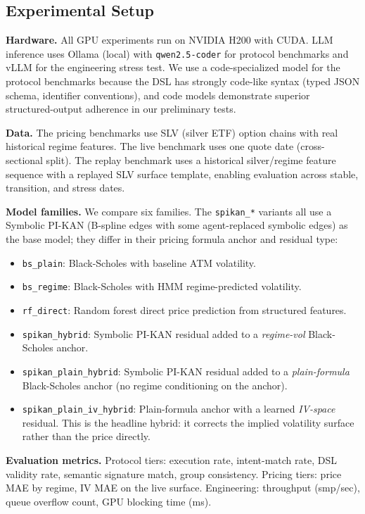 \documentclass[11pt,a4paper]{article}
\begin{document}
\subsection{Experimental Setup}

\textbf{Hardware.} All GPU experiments run on NVIDIA H200 with CUDA. LLM inference uses
Ollama (local) with \texttt{qwen2.5-coder} for protocol benchmarks and vLLM for the
engineering stress test. We use a code-specialized model for the protocol benchmarks
because the DSL has strongly code-like syntax (typed JSON schema, identifier
conventions), and code models demonstrate superior structured-output adherence in our
preliminary tests.

\textbf{Data.} The pricing benchmarks use SLV (silver ETF) option chains with real
historical regime features. The live benchmark uses one quote date (cross-sectional
split). The replay benchmark uses a historical silver/regime feature sequence with a
replayed SLV surface template, enabling evaluation across stable, transition, and
stress dates.

\textbf{Model families.} We compare six families. The \texttt{spikan\_*} variants all
use a Symbolic PI-KAN (B-spline edges with some agent-replaced symbolic edges) as the
base model; they differ in their pricing formula anchor and residual type:
\begin{itemize}[nosep]
  \item \texttt{bs\_plain}: Black-Scholes with baseline ATM volatility.
  \item \texttt{bs\_regime}: Black-Scholes with HMM regime-predicted volatility.
  \item \texttt{rf\_direct}: Random forest direct price prediction from structured features.
  \item \texttt{spikan\_hybrid}: Symbolic PI-KAN residual added to a \emph{regime-vol} Black-Scholes anchor.
  \item \texttt{spikan\_plain\_hybrid}: Symbolic PI-KAN residual added to a \emph{plain-formula} Black-Scholes anchor (no regime conditioning on the anchor).
  \item \texttt{spikan\_plain\_iv\_hybrid}: Plain-formula anchor with a learned \emph{IV-space} residual. This is the headline hybrid: it corrects the implied volatility surface rather than the price directly.
\end{itemize}

\textbf{Evaluation metrics.} Protocol tiers: execution rate, intent-match rate, DSL
validity rate, semantic signature match, group consistency. Pricing tiers: price MAE by
regime, IV MAE on the live surface. Engineering: throughput (smp/sec), queue overflow
count, GPU blocking time (ms).
\end{document}

